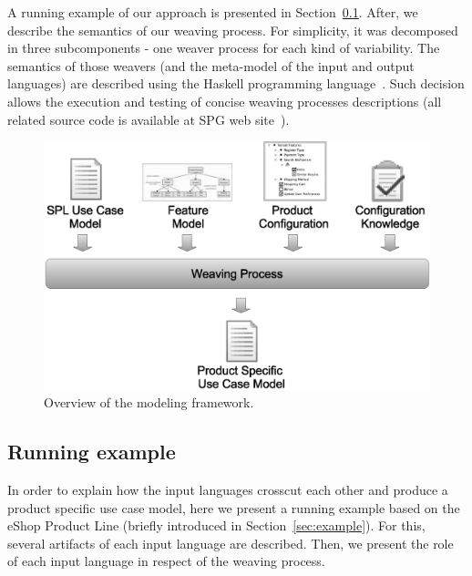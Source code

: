 A running example of our approach is presented in Section~\ref{sub:running}. After, we describe the semantics of our weaving process. For 
simplicity, it was decomposed in three subcomponents - one weaver process for each kind of variability.  The semantics of those 
weavers (and the meta-model of the input and output languages) are described using the Haskell programming language~\cite{haskell-report}. 
Such decision allows the execution and testing of concise weaving processes descriptions (all related source code is available at 
SPG web site~\cite{spg-url}).


\begin{figure}[h]
 \begin{center}
  \includegraphics[scale=0.30]{img/weave-process2.eps}
  \caption{Overview of the modeling framework.}
  \label{fig:weave-process}
  \end{center}
\end{figure}

\subsection{Running example}
\label{sub:running}

In order to explain how the input languages crosscut each other and produce a product specific use case model, here we present a 
running example based on the eShop Product Line (briefly introduced in Section~\ref{sec:example}). For this, several artifacts of each 
input language are described. Then, we present the role of each input language in respect of the weaving process.

